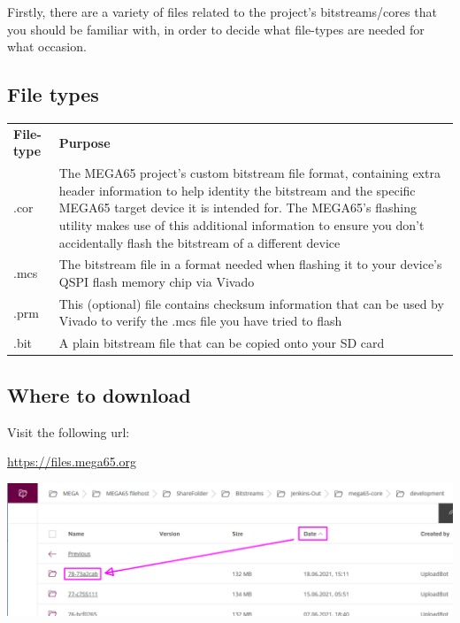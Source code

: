Firstly, there are a variety of files related to the project's bitstreams/cores that you should be familiar with, in order to decide what file-types are needed for what occasion.

\subsection{File types}

\begin{center}
  \begin{longtable}{|R{1.5cm}|p{10cm}|}
    \hhline{|=|=|}
    {\textbf{File-type}} & {\textbf{Purpose}} \\
    \hhline{|=|=|}
    {.cor} & {The MEGA65 project's custom bitstream file format, containing extra header information to help identity the bitstream and the specific MEGA65 target device it is intended for. The MEGA65's flashing utility makes use of this additional information to ensure you don't accidentally flash the bitstream of a different device} \\
    \hline
    {.mcs} & {The bitstream file in a format needed when flashing it to your device's QSPI flash memory chip via Vivado} \\
    \hline
    {.prm} & {This (optional) file contains checksum information that can be used by Vivado to verify the .mcs file you have tried to flash} \\
    \hline
    {.bit} & {A plain bitstream file that can be copied onto your SD card} \\
    \hline
  \end{longtable}
\end{center}

\subsection{Where to download}

Visit the following url:

\url{https://files.mega65.org}

\includegraphics[width=\linewidth]{images/latest_bitstream.png}

